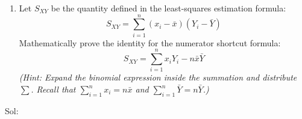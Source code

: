 \documentclass[11pt,svgnames,spanish,oneside]{amsart}
\newenvironment{mysolution}{%
  \solution\color{blue}Sol:
}{%
  \endsolution
}
\begin{document}
\begin{enumerate}[label=\textbf{P\arabic*.},itemsep=1em]
\begin{enumerate}
  \medskip
  We want to fit a linear regression line using the least-squares estimators $\hat{\beta}$ and $\hat{\alpha}$:
  $$ \hat{\beta} = \frac{\sum_{i=1}^n (x_i - \bar{x})(Y_i - \bar{Y})}{\sum_{i=1}^n (x_i - \bar{x})^2}, \quad \hat{\alpha} = \bar{Y} - \hat{\beta}\bar{x} $$
  where $\bar{x} = \frac{\sum_{i=1}^n x_i}{n}$ and $\bar{Y} = \frac{\sum_{i=1}^n Y_i}{n}$.

  \begin{enumerate}
    \item Compute the sample means $\bar{x}$ and $\bar{Y}$.
    \item Determine the exact values of the slope estimator $\hat{\beta}$ and the intercept estimator $\hat{\alpha}$.
    \item using the model $\hat{Y} = \hat{\alpha} + \hat{\beta}x$Predict the expected elongation $\hat{Y}$ of the hydrogel sample if a tensile force of $x = 2.5$ N is applied .
  \end{enumerate}

  \bigskip
  \item Let $S_{XY}$ be the quantity defined in the least-squares estimation formula:
  $$ S_{XY} = \sum_{i=1}^n (x_i - \bar{x})(Y_i - \bar{Y})$$
  Mathematically prove the identity for the numerator shortcut formula:
    $$ S_{XY} = \sum_{i=1}^n x_i Y_i - n\bar{x}\bar{Y} $$
    \textit{(Hint: Expand the binomial expression inside the summation and distribute $\sum$. Recall that $\sum_{i=1}^n x_i = n\bar{x}$ and $\sum_{i=1}^n \bar{Y} = n\bar{Y}$.)}

  \end{enumerate}

\end{enumerate}


\begin{mysolution}



  \end{mysolution}
\end{document}
